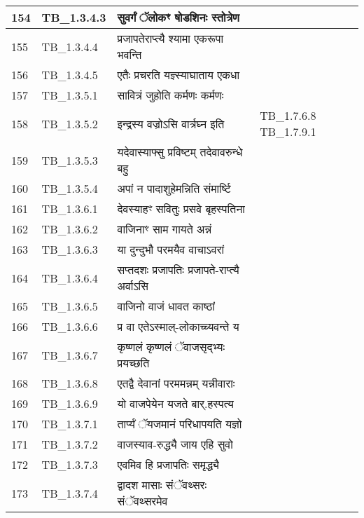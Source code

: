 \documentclass[17pt]{extarticle}
\begin{document}
\begin{longtable}{||p{0.4in}||p{0.9in}||p{4.0in}||p{0.9in}||}
        \hline
            154 & TB\_1.3.4.3 & सुवर्गं ॅलोकꣳ षोडशिनः स्तोत्रेण &      \\
        \hline
            155 & TB\_1.3.4.4 & प्रजापतेराप्त्यै श्यामा एकरूपा भवन्ति &      \\
        \hline
            156 & TB\_1.3.4.5 & एतैः प्रचरति यज्ञ्स्याघाताय एकधा &      \\
        \hline
            157 & TB\_1.3.5.1 & सावित्रं जुहोति कर्मणः कर्मणः &      \\
        \hline
            158 & TB\_1.3.5.2 & इन्द्रस्य वज्रोऽसि वार्त्रघ्न इति &  TB\_1.7.6.8 TB\_1.7.9.1       \\
        \hline
            159 & TB\_1.3.5.3 & यदेवास्याफ्सु प्रविष्टम् तदेवावरुन्धे बहु &      \\
        \hline
            160 & TB\_1.3.5.4 & अपां न पादाशुहेमन्निति संमार्ष्टि &      \\
        \hline
            161 & TB\_1.3.6.1 & देवस्याहꣳ सवितुः प्रसवे बृहस्पतिना &      \\
        \hline
            162 & TB\_1.3.6.2 & वाजिनाꣳ साम गायते अन्नं &      \\
        \hline
            163 & TB\_1.3.6.3 & या दुन्दुभौ परमयैव वाचाऽवरां &      \\
        \hline
            164 & TB\_1.3.6.4 & सप्तदशः प्रजापतिः प्रजापते{-}राप्त्यै अर्वाऽसि &      \\
        \hline
            165 & TB\_1.3.6.5 & वाजिनो वाजं धावत काष्ठां &      \\
        \hline
            166 & TB\_1.3.6.6 & प्र वा एतेऽस्माल्{-}लोकाच्च्यवन्ते य &      \\
        \hline
            167 & TB\_1.3.6.7 & कृष्णलं कृष्णलं ॅवाजसृद्भ्यः प्रयच्छति &      \\
        \hline
            168 & TB\_1.3.6.8 & एतद्वै देवानां परममन्नम् यन्नीवाराः &      \\
        \hline
            169 & TB\_1.3.6.9 & यो वाजपेयेन यजते बार्.हस्पत्य &      \\
        \hline
            170 & TB\_1.3.7.1 & तार्प्यं ॅयजमानं परिधापयति यज्ञो &      \\
        \hline
            171 & TB\_1.3.7.2 & वाजस्याव{-}रुद्ध्यै जाय एहि सुवो &      \\
        \hline
            172 & TB\_1.3.7.3 & एवमिव हि प्रजापतिः समृद्ध्यै &      \\
        \hline
            173 & TB\_1.3.7.4 & द्वादश मासाः संॅवथ्सरः संॅवथ्सरमेव &      \\

\end{longtable}
\end{document}
